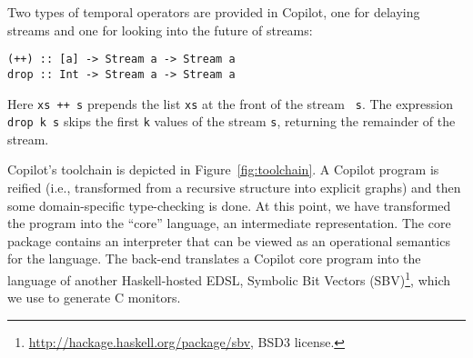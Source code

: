 Two types of temporal operators are provided in Copilot, one for
delaying streams and one for looking into the future of streams:
\begin{lstlisting}[frame=single]
(++) :: [a] -> Stream a -> Stream a
drop :: Int -> Stream a -> Stream a
\end{lstlisting}
%
Here {\tt xs ++ s} prepends the list {\tt xs} at the front of the stream {\tt
  s}.  The expression {\tt drop k s} skips the first {\tt k} values of the
stream {\tt s}, returning the remainder of the stream.



Copilot's toolchain is depicted in Figure~\ref{fig:toolchain}. A
Copilot program is reified (i.e., transformed from a recursive
structure into explicit graphs) and then some domain-specific
type-checking is done.  At this point, we have transformed the program
into the ``core'' language, an intermediate representation.  The core
package contains an interpreter that can be viewed as an operational
semantics for the language.  The back-end translates a Copilot core
program into the language of another Haskell-hosted EDSL, Symbolic Bit
Vectors (SBV)\footnote{\url{http://hackage.haskell.org/package/sbv},
  BSD3 license.}, which we use to generate C monitors.






